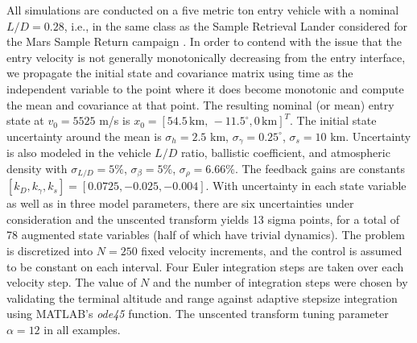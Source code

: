 \documentclass[journal ]{new-aiaa}
\begin{document}
All simulations are conducted on a five metric ton entry vehicle with a nominal $L/D=0.28$, i.e., in the same class as the Sample Retrieval Lander considered for the Mars Sample Return campaign \cite{MSR}. In order to contend with the issue that the entry velocity is not generally monotonically decreasing from the entry interface, we propagate the initial state and covariance matrix using time as the independent variable to the point where it does become monotonic and compute the mean and covariance at that point. The resulting nominal (or mean) entry state at $v_0 = 5525$ m/s is $x_0 = [54.5\,\mathrm{km},\,-11.5^{\circ}, 0\,\mathrm{km}]^T$. The initial state uncertainty around the mean is $\sigma_h = 2.5$ km, $\sigma_{\gamma} = 0.25^{\circ}$, $\sigma_s = 10$ km. Uncertainty is also modeled in the vehicle $L/D$ ratio, ballistic coefficient, and atmospheric density with $\sigma_{L/D} = 5\%$, $\sigma_{\beta} = 5\%$, $\sigma_{\rho} = 6.66\%$. The feedback gains are constants $[k_D, k_{\gamma}, k_s] = [0.0725, -0.025, -0.004]$. With uncertainty in each state variable as well as in three model parameters, there are six uncertainties under consideration and the unscented transform yields 13 sigma points, for a total of 78 augmented state variables (half of which have trivial dynamics). The problem is discretized into $N=250$ fixed velocity increments, and the control is assumed to be constant on each interval. Four Euler integration steps are taken over each velocity step. The value of $ N $ and the number of integration steps were chosen by validating the terminal altitude and range against adaptive stepsize integration using MATLAB's \textit{ode45} function. The unscented transform tuning parameter $\alpha=12$ in all examples. 


\end{document}
